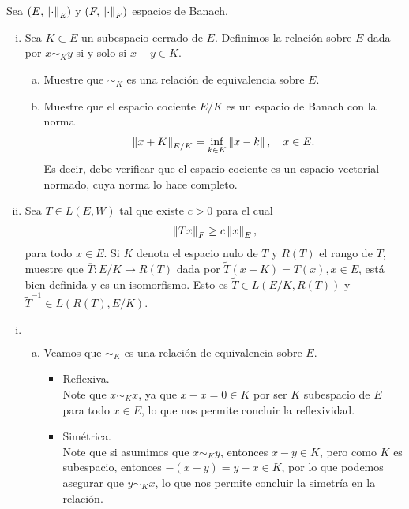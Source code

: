 \begin{homeworkProblem}
  Sea $(E,\left\|\cdot\right\|_{E})$ y $(F,\left\|\cdot\right\|_{F})$ espacios de Banach.
  \begin{enumerate}[(i)]
    \item Sea $K\subset E$ un subespacio cerrado de $E$. Definimos la relación sobre $E$ dada por $x\sim_{K} y$ si y solo si $x-y\in K$.
    \begin{enumerate}[(a)]
      \item Muestre que $\sim_{K}$ es una relación de equivalencia sobre $E$.
      \item Muestre que el espacio cociente $E/K$ es un espacio de Banach con la norma
        \begin{align*}
          \left\|x+K\right\|_{E/K}=\inf_{k\in K}\left\|x-k\right\|,\quad x\in E.
        \end{align*}
        Es decir, debe verificar que el espacio cociente es un espacio vectorial normado, cuya norma lo hace completo.
    \end{enumerate}
    \item Sea $T\in L(E,W)$ tal que existe $c>0$ para el cual
      \begin{align*}
        \left\|Tx\right\|_{F}\geq c\left\|x\right\|_{E},
      \end{align*}
      para todo $x\in E$. Si $K$ denota el espacio nulo de $T$ y $R(T)$ el rango de $T$, muestre que $\overline{T}:E/K\to R(T)$ dada por $\tilde{T}(x+K)=T(x),x\in E$, está bien definida y es un isomorfismo. Esto es $\tilde{T}\in L(E/K,R(T))$ y $\tilde{T}^{-1}\in L(R(T),E/K)$.  
  \end{enumerate}
  \begin{solution}
    \begin{enumerate}[(i)]
      \item $\phantom{x}$\\
      \begin{enumerate}[(a)]
        \item Veamos que $\sim_{K}$ es una relación de equivalencia sobre $E$.
          \begin{itemize}
            \item Reflexiva.\\
              Note que $x\sim_{K}x$, ya que $x-x=0\in K$ por ser $K$ subespacio de $E$ para todo $x\in E$, lo que nos permite concluir la reflexividad.
            \item Simétrica.\\
              Note que si asumimos que $x\sim_{K}y$, entonces $x-y\in K$, pero como $K$ es subespacio, entonces $-(x-y)=y-x\in K$, por lo que podemos asegurar que $y\sim_{K}x$, lo que nos permite concluir la simetría en la relación. 

\end{itemize}
\end{enumerate}
\end{enumerate}
\end{solution}
\end{homeworkProblem}
